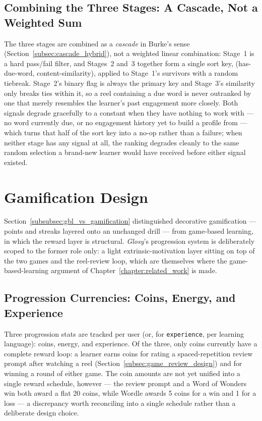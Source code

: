     \subsection{Combining the Three Stages: A Cascade, Not a Weighted Sum}
    \label{subsec:cascade_design}
    The three stages are combined as a \emph{cascade} in Burke's sense (Section~\ref{subsec:cascade_hybrid}), not a weighted linear combination: Stage~1 is a hard pass/fail filter, and Stages~2 and~3 together form a single sort key, (has-due-word, content-similarity), applied to Stage~1's survivors with a random tiebreak. Stage~2's binary flag is always the primary key and Stage~3's similarity only breaks ties within it, so a reel containing a due word is never outranked by one that merely resembles the learner's past engagement more closely. Both signals degrade gracefully to a constant when they have nothing to work with --- no word currently due, or no engagement history yet to build a profile from --- which turns that half of the sort key into a no-op rather than a failure; when neither stage has any signal at all, the ranking degrades cleanly to the same random selection a brand-new learner would have received before either signal existed.


\section{Gamification Design}
\label{sec:gamification_design}
    Section~\ref{subsubsec:gbl_vs_gamification} distinguished decorative gamification --- points and streaks layered onto an unchanged drill --- from game-based learning, in which the reward layer is structural. \textit{Glosy}'s progression system is deliberately scoped to the former role only: a light extrinsic-motivation layer sitting on top of the two games and the reel-review loop, which are themselves where the game-based-learning argument of Chapter~\ref{chapter:related_work} is made.

    \subsection{Progression Currencies: Coins, Energy, and Experience}
    \label{subsec:currencies_design}
    Three progression stats are tracked per user (or, for \texttt{experience}, per learning language): coins, energy, and experience. Of the three, only coins currently have a complete reward loop: a learner earns coins for rating a spaced-repetition review prompt after watching a reel (Section~\ref{subsec:game_review_design}) and for winning a round of either game. The coin amounts are not yet unified into a single reward schedule, however --- the review prompt and a Word of Wonders win both award a flat 20 coins, while Wordle awards 5 coins for a win and 1 for a loss --- a discrepancy worth reconciling into a single schedule rather than a deliberate design choice.

